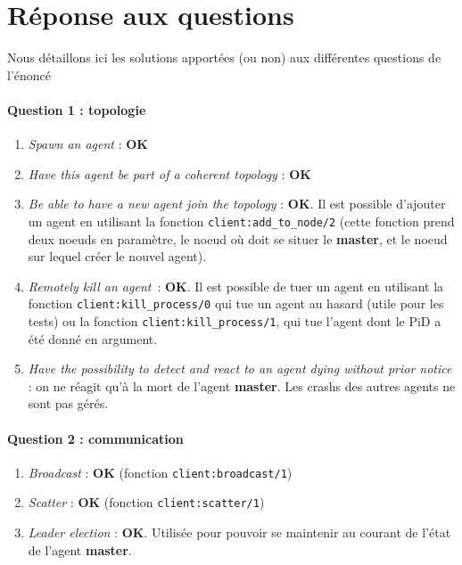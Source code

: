 \documentclass[a4paper]{article}
\begin{document}
\section*{Réponse aux questions}
Nous détaillons ici les solutions apportées (ou non) aux différentes questions de l'énoncé

\paragraph{Question 1 : topologie}
\begin{enumerate}[label=\alph*)]
    \item \textit{Spawn an agent} : \textbf{OK}
    \item \textit{Have this agent be part of a coherent topology} : \textbf{OK}
    \item \textit{Be able to have a new agent join the topology} : \textbf{OK}. Il est possible d'ajouter un agent en utilisant la fonction \texttt{client:add\_to\_node/2}
    (cette fonction prend deux noeuds en paramètre, le noeud où doit se situer le \textbf{master}, et le noeud sur lequel créer le nouvel agent).
    \item \textit{Remotely kill an agent} : \textbf{OK}. Il est possible de tuer un agent en utilisant la fonction \texttt{client:kill\_process/0} qui tue un agent au hasard (utile pour les tests)
    ou la fonction \texttt{client:kill\_process/1}, qui tue l'agent dont le PiD a été donné en argument.
    \item \textit{Have the possibility to detect and react to an agent dying without prior notice} : on ne réagit qu'à la mort de l'agent \textbf{master}. Les crashs des autres agents ne sont pas gérés.
\end{enumerate}

\paragraph{Question 2 : communication}
\begin{enumerate}[label=\alph*)]
    \item \textit{Broadcast} : \textbf{OK} (fonction \texttt{client:broadcast/1})
    \item \textit{Scatter} : \textbf{OK} (fonction \texttt{client:scatter/1})
    \item \textit{Leader election} : \textbf{OK}. Utilisée pour pouvoir se maintenir au courant de l'état de l'agent \textbf{master}.
\end{enumerate}
\end{document}
